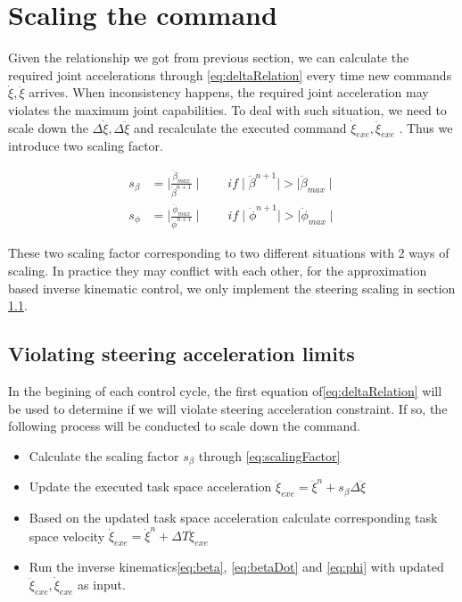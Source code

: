 \section{Scaling the command}
\label{sec:Scaling}
Given the relationship we got from previous section, we can calculate the required joint accelerations through \cref{eq:deltaRelation} every time new commands $\dot{\xi},\ddot{\xi}$ arrives. When inconsistency happens, the required joint acceleration may violates the maximum joint capabilities. To deal with such situation, we need to scale down the $\Delta\dot{\xi},\Delta\ddot{\xi}$ and recalculate the executed command $\dot{\xi}_{exe},\ddot{\xi}_{exe}$ . Thus we introduce two scaling factor.

\begin{equation}\label{eq:scalingFactor}
    \begin{split}
        s_{\beta}&=\mid\frac{\ddot{\beta}_{max}}{\ddot{\beta}^{n+1}}\mid \qquad if \mid\ddot{\beta}^{n+1}\mid>\mid\ddot{\beta}_{max}\mid \\
        s_{\phi}&=\mid\frac{\ddot{\phi}_{max}}{\ddot{\phi}^{n+1}}\mid \qquad if \mid\ddot{\phi}^{n+1}\mid>\mid\ddot{\phi}_{max}\mid
    \end{split}
\end{equation}


These two scaling factor corresponding to two different situations with 2 ways of scaling. In practice they may conflict with each other, for the approximation based inverse kinematic control, we only implement the steering scaling in section \cref{subsec:scaleBeta}.

\subsection{Violating steering acceleration limits}\label{subsec:scaleBeta}
In the begining of each control cycle, the first equation of\cref{eq:deltaRelation} will be used to determine if we will violate steering acceleration constraint. If so, the following process will be conducted to scale down the command.

\begin{itemize}
    \item Calculate the scaling factor $s_{\beta}$ through \cref{eq:scalingFactor}
    \item Update the executed task space acceleration $\ddot{\xi}_{exe}=\ddot{\xi}^n+s_{\beta}\Delta\ddot{\xi}$
    \item Based on the updated task space acceleration calculate corresponding task space velocity $\dot{\xi}_{exe}=\dot{\xi}^n+\Delta T\ddot{\xi}_{exe}$
    \item Run the inverse kinematics\cref{eq:beta}, \cref{eq:betaDot} and \cref{eq:phi} with updated $\ddot{\xi}_{exe}, \dot{\xi}_{exe}$ as input.
\end{itemize}

